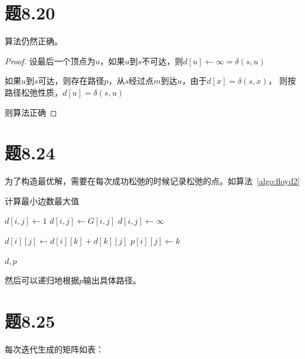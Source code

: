 \documentclass[a4paper,twoside]{article}
\begin{document}
\begin{spacing}{1.2}
\section{题8.20}

算法仍然正确。

\begin{proof}

	设最后一个顶点为$u$，如果$u$到$s$不可达，则$d[u]\gets \infty=\delta(s,u)$

	如果$u$到$s$可达，则存在路径$p$，从$s$经过点$m$到达$u$，由于$d[x]=\delta(s,x)$，
	则按路径松弛性质，$d[u]=\delta(s,u)$

	则算法正确
\end{proof}

\section{题8.24}

为了构造最优解，需要在每次成功松弛的时候记录松弛的点。如算法~\ref{algo:floyd2}

\begin{algorithm}
	\caption{计算最小边数最大值}
	\label{algo:floyd2}
	\begin{algorithmic}[1]		
					\State $d[i,j]\gets 1$
					\State $d[i,j]\gets G[i,j]$
				\Else
					\State $d[i,j]\gets \infty$
				\EndIf
			\EndFor
		\EndFor
		
						\State $d[i][j]\gets d[i][k]+d[k][j]$
						\State $p[i][j]\gets k$
					\EndIf
				\EndFor
			\EndFor
		\EndFor

		\State \Return $d,p$
		\EndProcedure
	\end{algorithmic}
\end{algorithm}

然后可以递归地根据$p$输出具体路径。

\section{题8.25}
每次迭代生成的矩阵如表：


\end{spacing}
\end{document}
